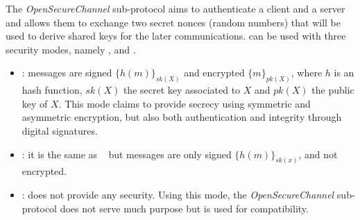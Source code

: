 \newcommand{\gereq}{GEReq}
\newcommand{\geres}{GERes}
\newcommand{\oscreq}{OSCReq}
\newcommand{\oscres}{OSCRes}


The {\em OpenSecureChannel} sub-protocol  aims to authenticate a client and
a server and allows them to exchange two secret nonces (random numbers) that
will be used to derive shared keys for the later communications.
\opcua{} can be used with three security modes, namely {\em \smn}, {\em \sms} and
{\em \smse}.
\vspace{-.5em}
\begin{itemize}
    \item {\em \smse}: messages are signed $\{h(m)\}_{sk(X)}$ and
      encrypted $\{m\}_{pk(X)}$, where $h$ is an hash function, $sk(X)$ the
      secret key associated to $X$ and $pk(X)$ the public key of $X$.
      This mode claims to provide secrecy
      using symmetric and asymmetric encryption, but also both
      authentication and integrity through digital signatures.
  \item {\em \sms}: it is the same as \smse~ but messages are only signed
      $\{h(m)\}_{sk(x)}$, and not encrypted.
  \item {\em \smn}: does not provide any security.  Using this mode, the
      {\em OpenSecureChannel} sub-protocol does not serve much
      purpose but is used for compatibility.
\end{itemize}

